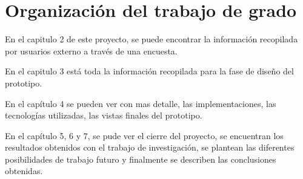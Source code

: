 \section{Organización del trabajo de grado}
En el capitulo 2 de este proyecto, se puede encontrar la información recopilada por usuarios externo a través de una encuesta. 

En el capitulo 3 está toda la información recopilada para la fase de diseño del prototipo.

En el capítulo 4 se pueden ver con mas detalle, las implementaciones, las tecnologías utilizadas, las vistas finales del prototipo.

En el capítulo 5, 6 y 7, se pude ver el cierre del proyecto, se encuentran los resultados obtenidos con el trabajo de investigación, se plantean las diferentes posibilidades de trabajo futuro y finalmente se describen las conclusiones obtenidas.